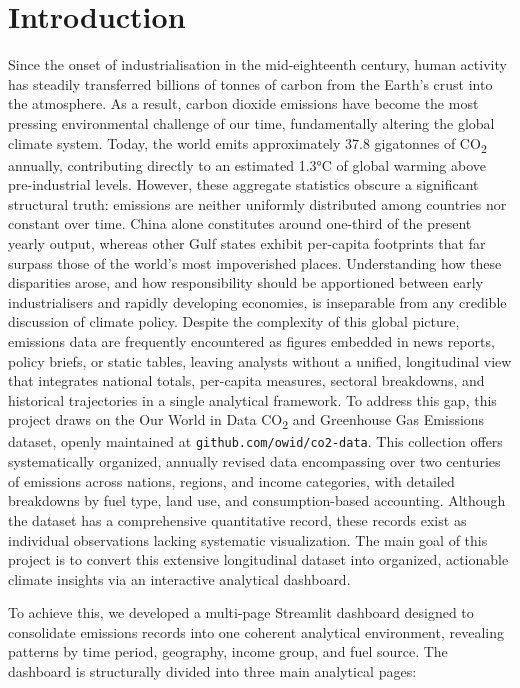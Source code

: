 \documentclass[a4paper,12pt]{article}
\begin{document}
\clearpage
{}
\renewcommand{\contentsname}{Table of Contents}
\tableofcontents

\newpage
\section{Introduction}
Since the onset of industrialisation in the mid-eighteenth century, human activity has steadily transferred billions of tonnes of carbon from the Earth's crust into the atmosphere. 
As a result, carbon dioxide emissions have become the most pressing environmental challenge of our time, fundamentally altering the global climate system. Today, the world emits
approximately 37.8 gigatonnes of CO\textsubscript{2} annually, contributing directly to an estimated
1.3°C of global warming above pre-industrial levels. However, these aggregate statistics obscure a significant structural truth: emissions are neither uniformly distributed among countries nor constant over time. China alone constitutes around one-third of the present yearly output, whereas other Gulf states exhibit per-capita footprints that far surpass those of the world's most impoverished places. Understanding how these disparities arose, and how responsibility
should be apportioned between early industrialisers and rapidly developing economies, is
inseparable from any credible discussion of climate policy.
Despite the complexity of this global picture, emissions data are frequently encountered as figures embedded in news reports, policy briefs, or static tables, leaving
analysts without a unified, longitudinal view that integrates national totals, per-capita
measures, sectoral breakdowns, and historical trajectories in a single analytical framework.
To address this gap, this project draws on the Our World in Data CO\textsubscript{2} and Greenhouse Gas
Emissions dataset, openly maintained at \texttt{github.com/owid/co2-data}. This collection offers systematically organized, annually revised data encompassing over two centuries of emissions across nations, regions, and income categories, with detailed breakdowns by fuel type, land use, and consumption-based accounting. Although the dataset has a comprehensive quantitative record, these records exist as individual observations lacking systematic visualization. The main goal of this project is to convert this extensive longitudinal dataset into organized, actionable climate insights via an interactive analytical dashboard.

To achieve this, we developed a multi-page Streamlit dashboard designed to consolidate
emissions records into one coherent analytical environment, revealing patterns by time
period, geography, income group, and fuel source. The dashboard is structurally divided
into three main analytical pages:
\end{document}
